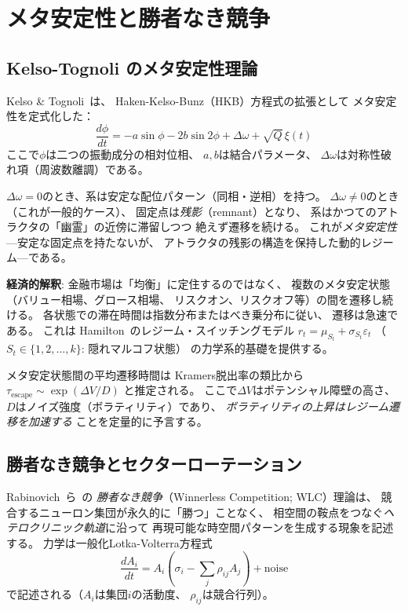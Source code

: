 \documentclass[12pt,twocolumn]{ltjsarticle}
\begin{document}
\section{メタ安定性と勝者なき競争}
\label{sec:metastability}

\subsection{Kelso-Tognoli のメタ安定性理論}

Kelso \& Tognoli~\cite{Tognoli2014}は、
Haken-Kelso-Bunz（HKB）方程式の拡張として
メタ安定性を定式化した：
\begin{equation}
\frac{d\phi}{dt} = -a\sin\phi - 2b\sin 2\phi + \Delta\omega
+ \sqrt{Q}\,\xi(t)
\end{equation}
ここで$\phi$は二つの振動成分の相対位相、
$a, b$は結合パラメータ、
$\Delta\omega$は対称性破れ項（周波数離調）である。

$\Delta\omega = 0$のとき、系は安定な配位パターン（同相・逆相）を持つ。
$\Delta\omega \neq 0$のとき（これが一般的ケース）、
固定点は\emph{残影}（remnant）となり、
系はかつてのアトラクタの「幽霊」の近傍に滞留しつつ
絶えず遷移を続ける。
これが\emph{メタ安定性}---安定な固定点を持たないが、
アトラクタの残影の構造を保持した動的レジーム---である。

\textbf{経済的解釈}:
金融市場は「均衡」に定住するのではなく、
複数のメタ安定状態（バリュー相場、グロース相場、
リスクオン、リスクオフ等）の間を遷移し続ける。
各状態での滞在時間は指数分布またはべき乗分布に従い、
遷移は急速である。
これは Hamilton~\cite{Hamilton1989}のレジーム・スイッチングモデル
$r_t = \mu_{S_t} + \sigma_{S_t}\varepsilon_t$
（$S_t \in \{1, 2, \ldots, k\}$: 隠れマルコフ状態）
の力学系的基礎を提供する。

メタ安定状態間の平均遷移時間は
Kramers脱出率の類比から
$\tau_{\text{escape}} \sim \exp(\Delta V / D)$
と推定される。
ここで$\Delta V$はポテンシャル障壁の高さ、
$D$はノイズ強度（ボラティリティ）であり、
\emph{ボラティリティの上昇はレジーム遷移を加速する}
ことを定量的に予言する。

\subsection{勝者なき競争とセクターローテーション}

Rabinovich~ら~\cite{Rabinovich2008}の
\emph{勝者なき競争}（Winnerless Competition; WLC）理論は、
競合するニューロン集団が永久的に「勝つ」ことなく、
相空間の鞍点をつなぐ\emph{ヘテロクリニック軌道}に沿って
再現可能な時空間パターンを生成する現象を記述する。
力学は一般化Lotka-Volterra方程式
\begin{equation}
\frac{dA_i}{dt} = A_i\left(\sigma_i - \sum_j \rho_{ij} A_j\right)
+ \text{noise}
\end{equation}
で記述される（$A_i$は集団$i$の活動度、
$\rho_{ij}$は競合行列）。
\end{document}
